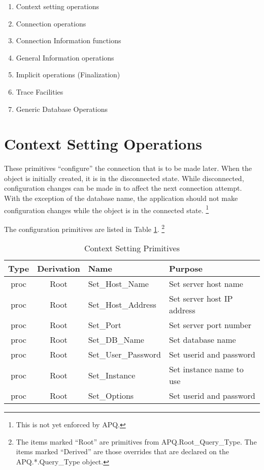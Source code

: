 \documentclass[english,letterpaper]{book}
\begin{document}
\begin{enumerate}
   \item Context setting operations
   \item Connection operations
   \item Connection Information functions
   \item General Information operations
   \item Implicit operations (Finalization)
   \item Trace Facilities
   \item Generic Database Operations
\end{enumerate}

\section{Context Setting Operations}\label{Context_Setting_Operations}

These primitives ``configure'' the connection that is
to be made later. When the object is initially created, it is in the
disconnected state. While disconnected, configuration changes can be
made in to affect the next connection attempt. With the exception of the
database name, the application should not make configuration changes
while the object is in the connected state.
\footnote{This is not yet enforced by APQ.}

The configuration primitives are listed in Table \ref{t:ctxops}.
\footnote{The items marked ``Root'' are primitives from APQ.Root\_Query\_Type.
The items marked {}``Derived'' are those overrides that are declared
on the APQ.{*}.Query\_Type object.}

\begin{table}
   \begin{center}
      \begin{tabular}{ccll}
      Type & Derivation & Name                  & Purpose \\
      \hline 
      proc & Root       & Set\_Host\_Name       & Set server host name \\
      proc & Root       & Set\_Host\_Address    & Set server host IP address \\
      proc & Root       & Set\_Port             & Set server port number \\
      proc & Root       & Set\_DB\_Name         & Set database name \\
      proc & Root       & Set\_User\_Password   & Set userid and password \\
      proc & Root       & Set\_Instance         & Set instance name to use \\
      proc & Root       & Set\_Options          & Set userid and password \\
      \end{tabular}
   \end{center}
\caption{Context Setting Primitives}\label{t:ctxops}
\end{table}
\end{document}
